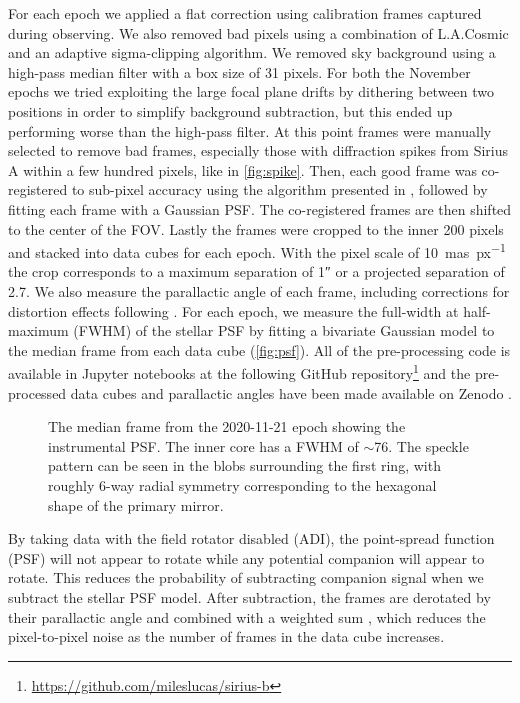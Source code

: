 \documentclass[twocolumn]{aastex631}
\begin{document}
For each epoch we applied a flat correction using calibration frames captured during observing. We also removed bad pixels using a combination of L.A.Cosmic \citep{dokkum_cosmic-ray_2001} and an adaptive sigma-clipping algorithm. We removed sky background using a high-pass median filter with a box size of 31 pixels. For both the November epochs we tried exploiting the large focal plane drifts by dithering between two positions in order to simplify background subtraction, but this ended up performing worse than the high-pass filter. At this point frames were manually selected to remove bad frames, especially those with diffraction spikes from Sirius A within a few hundred pixels, like in \autoref{fig:spike}. Then, each good frame was co-registered to sub-pixel accuracy using the algorithm presented in \citet{guizar-sicairos_efficient_2008}, followed by fitting each frame with a Gaussian PSF. The co-registered frames are then shifted to the center of the FOV. Lastly the frames were cropped to the inner 200 pixels and stacked into data cubes for each epoch. With the pixel scale of \qty{10}{mas\per px} the crop corresponds to a maximum separation of \ang{;;1} or a projected separation of \qty{2.7}{\au}. We also measure the parallactic angle of each frame, including corrections for distortion effects following \cite{yelda_improving_2010}. For each epoch, we measure the full-width at half-maximum (FWHM) of the stellar PSF by fitting a bivariate Gaussian model to the median frame from each data cube (\autoref{fig:psf}). All of the pre-processing code is available in Jupyter notebooks at the following GitHub repository\footnote{\href{https://github.com/mileslucas/sirius-b}{https://github.com/mileslucas/sirius-b}} and the pre-processed data cubes and parallactic angles have been made available on Zenodo \citep{lucas_nirc2_2021}.

\begin{figure}
    \centering
    \caption{The median frame from the 2020-11-21 epoch showing the instrumental PSF. The inner core has a FWHM of $\sim$\qty{76}{\milliarcsecond}. The speckle pattern can be seen in the blobs surrounding the first ring, with roughly 6-way radial symmetry corresponding to the hexagonal shape of the primary mirror.}
    \label{fig:psf}
\end{figure}

By taking data with the field rotator disabled (ADI), the point-spread function (PSF) will not appear to rotate while any potential companion will appear to rotate. This reduces the probability of subtracting companion signal when we subtract the stellar PSF model. After subtraction, the frames are derotated by their parallactic angle and combined with a weighted sum \citep{bottom_noise-weighted_2017}, which reduces the pixel-to-pixel noise as the number of frames in the data cube increases.
\end{document}
